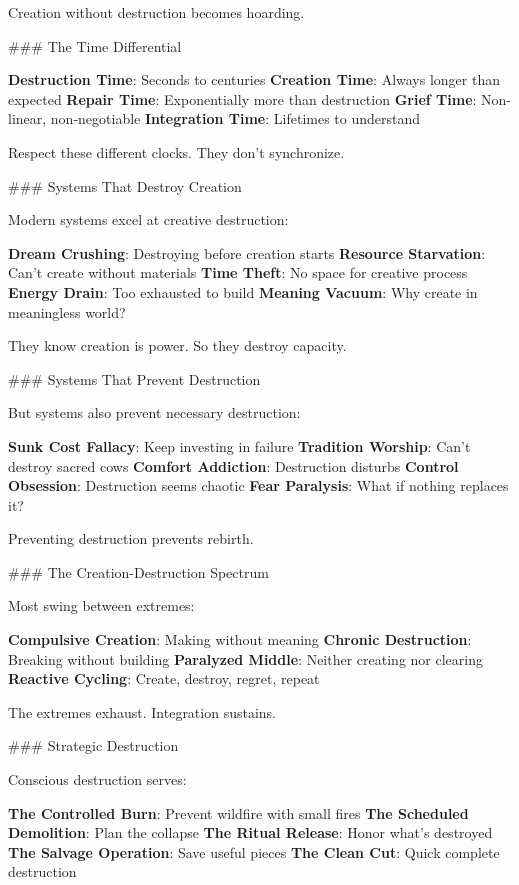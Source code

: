\documentclass[12pt]{book}
\begin{document}
Creation without destruction becomes hoarding.

\#\#\# The Time Differential

\textbf{Destruction Time}: Seconds to centuries
\textbf{Creation Time}: Always longer than expected
\textbf{Repair Time}: Exponentially more than destruction
\textbf{Grief Time}: Non-linear, non-negotiable
\textbf{Integration Time}: Lifetimes to understand

Respect these different clocks. They don't synchronize.

\#\#\# Systems That Destroy Creation

Modern systems excel at creative destruction:

\textbf{Dream Crushing}: Destroying before creation starts
\textbf{Resource Starvation}: Can't create without materials
\textbf{Time Theft}: No space for creative process
\textbf{Energy Drain}: Too exhausted to build
\textbf{Meaning Vacuum}: Why create in meaningless world?

They know creation is power. So they destroy capacity.

\#\#\# Systems That Prevent Destruction

But systems also prevent necessary destruction:

\textbf{Sunk Cost Fallacy}: Keep investing in failure
\textbf{Tradition Worship}: Can't destroy sacred cows
\textbf{Comfort Addiction}: Destruction disturbs
\textbf{Control Obsession}: Destruction seems chaotic
\textbf{Fear Paralysis}: What if nothing replaces it?

Preventing destruction prevents rebirth.

\#\#\# The Creation-Destruction Spectrum

Most swing between extremes:

\textbf{Compulsive Creation}: Making without meaning
\textbf{Chronic Destruction}: Breaking without building
\textbf{Paralyzed Middle}: Neither creating nor clearing
\textbf{Reactive Cycling}: Create, destroy, regret, repeat

The extremes exhaust. Integration sustains.

\#\#\# Strategic Destruction

Conscious destruction serves:

\textbf{The Controlled Burn}: Prevent wildfire with small fires
\textbf{The Scheduled Demolition}: Plan the collapse
\textbf{The Ritual Release}: Honor what's destroyed
\textbf{The Salvage Operation}: Save useful pieces
\textbf{The Clean Cut}: Quick complete destruction
\end{document}
